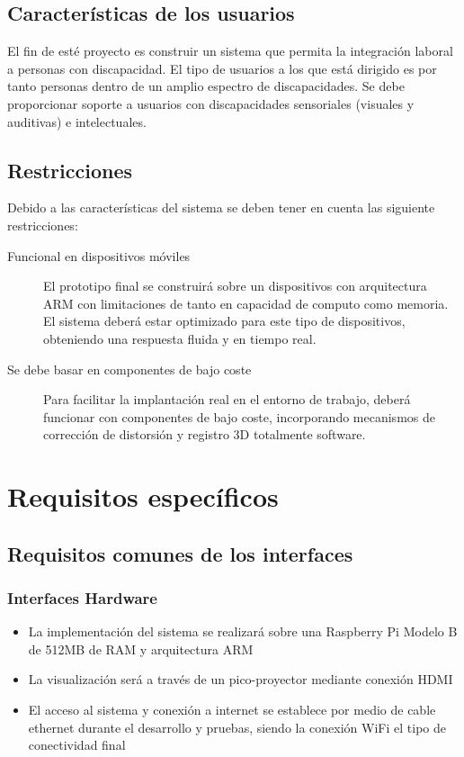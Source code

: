 \subsection{Características de los usuarios}
El fin de esté proyecto es construir un sistema que permita la integración laboral a personas con discapacidad. El tipo de usuarios a los que está dirigido es por tanto personas dentro de un amplio espectro de discapacidades.
Se debe proporcionar soporte a usuarios con discapacidades sensoriales (visuales y auditivas) e intelectuales.  

\subsection{Restricciones}
Debido a las características del sistema se deben tener en cuenta las siguiente restricciones:
\begin{description}

\item[Funcional en dispositivos móviles] El prototipo final se construirá sobre un dispositivos con arquitectura ARM con limitaciones de tanto en capacidad de computo como memoria. El sistema deberá estar optimizado para este tipo de dispositivos, obteniendo una respuesta fluida y en tiempo real.   

\item[Se debe basar en componentes de bajo coste] Para facilitar la implantación real en el entorno de trabajo, deberá funcionar con componentes de bajo coste, incorporando mecanismos de corrección de distorsión y registro 3D totalmente software.
\end{description}

\section{Requisitos específicos}
\subsection{Requisitos comunes de los interfaces}
\subsubsection{Interfaces Hardware}
\begin{itemize}
\item La implementación del sistema se realizará sobre una Raspberry Pi Modelo B de 512MB de RAM y arquitectura ARM 
\item La visualización será a través de un pico-proyector mediante conexión HDMI
\item El acceso al sistema y conexión a internet se establece por medio de cable ethernet durante el desarrollo y pruebas, siendo la conexión WiFi el tipo de conectividad final
\end{itemize}


